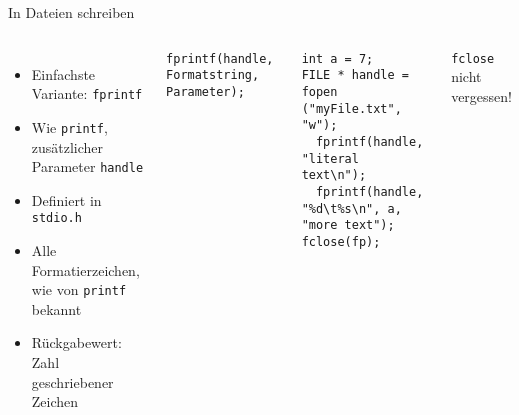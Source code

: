 
\begin{frame}[fragile]{In Dateien schreiben}
%
\begin{columns}[T]
\begin{itemize}
\item Einfachste Variante: \texttt{fprintf}
\item Wie \texttt{printf}, zusätzlicher Parameter \texttt{handle}
\item Definiert in \texttt{stdio.h}
\item Alle Formatierzeichen, wie von \texttt{printf} bekannt
\item Rückgabewert: Zahl geschriebener Zeichen
\end{itemize}
%
\vspace{-10pt}
\begin{codebox}[Syntax]
\begin{verbatim}
fprintf(handle, Formatstring, Parameter);
\end{verbatim}
\end{codebox}
%
\begin{codebox}[Beispiel]
\begin{verbatim}
int a = 7;
FILE * handle = fopen ("myFile.txt", "w");
  fprintf(handle, "literal text\n");
  fprintf(handle, "%d\t%s\n", a, "more text");
fclose(fp);
\end{verbatim}
\end{codebox}
%
\begin{warnbox}
\small
\texttt{fclose} nicht vergessen!
\end{warnbox}
\end{columns}
%
\end{frame}


